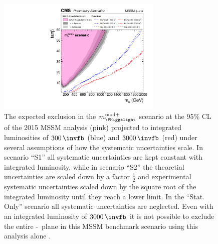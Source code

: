 \begin{figure}[h!]
\begin{center}
\includegraphics[width=0.7\textwidth]{./Conclusion/Figures/scenario_comp2.pdf}
\end{center}
\caption[The expected exclusion in the $m_{\PHiggslight}^{\text{mod+}}$ scenario
at the 95\% CL of the 2015 MSSM analysis, projected to integrated luminosities of $300$ and $3000\,\invfb$.]{The expected exclusion in the $m_{\PHiggslight}^{\text{mod+}}$ scenario
 at the 95\% CL of the 2015 MSSM analysis (pink)
projected to integrated luminosities of $300\,\invfb$ (blue) and $3000\,\invfb$ (red)
under several assumptions of how the systematic uncertainties scale. In scenario ``S1''
all systematic uncertainties are kept constant with integrated luminosity, while in scenario ``S2'' 
the theoretial uncertainties are scaled down by a factor $\frac{1}{2}$ and experimental
systematic uncertainties scaled down by the square root of the integrated luminosity until they reach
a lower limit. In the ``Stat. Only'' scenario all systematic uncertainties are neglected. Even with an integrated 
luminosity of $3000\,\invfb$ it is not possible to exclude the entire \mA-\tanb~plane
in this \ac{MSSM} benchmark scenario using this analysis alone \cite{HTT-projection}.}
\label{fig:mssm_projection_fig}
\end{figure}

